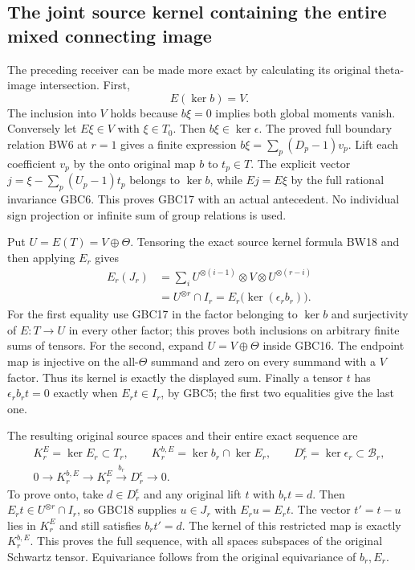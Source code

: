 \subsection{The joint source kernel containing the entire mixed connecting image}

The preceding receiver can be made more exact by calculating its
original theta-image intersection. First,
\begin{equation}\tag{GBC17}
 E(\ker b)=V.
\end{equation}
The inclusion into $V$ holds because $b\xi=0$ implies both
global moments vanish. Conversely let $E\xi\in V$ with
$\xi\in T_0$. Then $b\xi\in\ker\epsilon$. The proved full
boundary relation BW6 at $r=1$ gives a finite expression
$b\xi=\sum_p(D_p-1)v_p$. Lift each coefficient $v_p$ by the
onto original map $b$ to $t_p\in T$. The explicit vector
$j=\xi-\sum_p(U_p-1)t_p$ belongs to $\ker b$, while
$Ej=E\xi$ by the full rational invariance GBC6. This proves
GBC17 with an actual antecedent. No individual sign projection
or infinite sum of group relations is used.

Put $U=E(T)=V\oplus\Theta$. Tensoring the exact source kernel
formula BW18 and then applying $E_r$ gives
\begin{equation}\tag{GBC18}
 \begin{split}
 E_r(J_r)
   &=\sum_i U^{\otimes(i-1)}\otimes V\otimes U^{\otimes(r-i)}\\
   &=U^{\otimes r}\cap I_r
    =E_r\bigl(\ker(\epsilon_rb_r)\bigr).
 \end{split}
\end{equation}
For the first equality use GBC17 in the factor belonging to
$\ker b$ and surjectivity of $E:T\to U$ in every other factor;
this proves both inclusions on arbitrary finite sums of tensors.
For the second, expand $U=V\oplus\Theta$ inside GBC16.
The endpoint map is injective on the all-$\Theta$ summand and
zero on every summand with a $V$ factor. Thus its kernel is
exactly the displayed sum. Finally a tensor $t$ has
$\epsilon_rb_rt=0$ exactly when $E_rt\in I_r$, by GBC5;
the first two equalities give the last one.

The resulting original source spaces and their entire exact
sequence are
\begin{equation}\tag{GBC19}
 \begin{gathered}
 K_r^E=\ker E_r\subset T_r,\qquad
 K_r^{b,E}=\ker b_r\cap\ker E_r,\qquad
 D_r^\epsilon=\ker\epsilon_r\subset\mathcal B_r,\\
 0\longrightarrow K_r^{b,E}\longrightarrow K_r^E
                  \xrightarrow{b_r}D_r^\epsilon\longrightarrow0.
 \end{gathered}
\end{equation}
To prove onto, take $d\in D_r^\epsilon$ and any original
lift $t$ with $b_rt=d$. Then $E_rt\in U^{\otimes r}\cap I_r$,
so GBC18 supplies $u\in J_r$ with $E_ru=E_rt$.
The vector $t'=t-u$ lies in $K_r^E$ and still satisfies
$b_rt'=d$. The kernel of this restricted map is exactly
$K_r^{b,E}$. This proves the full sequence, with all spaces
subspaces of the original Schwartz tensor. Equivariance follows
from the original equivariance of $b_r,E_r$.

